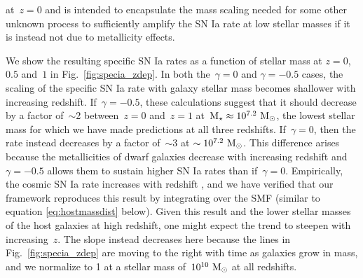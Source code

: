 \documentclass[ms.tex]{subfiles}
\begin{document}
at~$z = 0$ and is intended to encapsulate the mass scaling needed for some
other unknown process to sufficiently amplify the SN Ia rate at low stellar
masses if it is instead not due to metallicity effects.
\par
We show the resulting specific SN Ia rates as a function of stellar mass at
$z = 0$,~$0.5$ and~$1$ in Fig.~\ref{fig:specia_zdep}.
In both the~$\gamma = 0$ and $\gamma = -0.5$ cases, the scaling of the specific
SN Ia rate with galaxy stellar mass becomes shallower with increasing redshift.
If~$\gamma = -0.5$, these calculations suggest that it should decrease by a
factor of~$\sim$2 between~$z = 0$ and~$z = 1$ at~$\text{M}_\star \approx
10^{7.2}~\text{M}_\odot$, the lowest stellar mass for which we have made predictions at
all three redshifts.
If~$\gamma = 0$, then the rate instead decreases by a factor of~$\sim$3 at
$\sim 10^{7.2}~\text{M}_\odot$.
This difference arises because the metallicities of dwarf galaxies decrease
with increasing redshift and~$\gamma = -0.5$ allows them to sustain higher
SN Ia rates than if~$\gamma = 0$.
Empirically, the cosmic SN Ia rate increases with redshift
\citep[e.g.][]{Graur2014}, and we have verified that our framework reproduces
this result by integrating over the SMF (similar to equation
\ref{eq:hostmassdist} below).
Given this result and the lower stellar masses of the host galaxies at high
redshift, one might expect the trend to steepen with increasing~$z$.
The slope instead decreases here because the lines in Fig.~\ref{fig:specia_zdep}
are moving to the right with time as galaxies grow in mass, and we normalize to
1 at a stellar mass of~$10^{10}~\text{M}_\odot$ at all redshifts.
\end{document}
